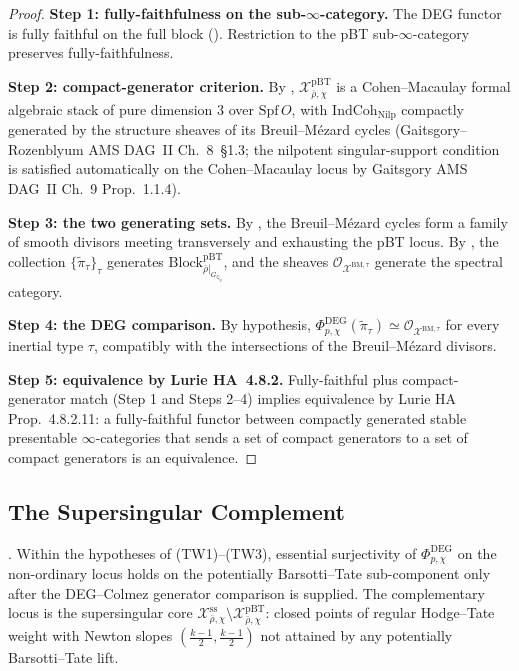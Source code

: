 \begin{proof}
\textbf{Step 1: fully-faithfulness on the sub-\(\infty\)-category.}
The DEG functor is fully faithful on the full block
(). Restriction to the pBT
sub-\(\infty\)-category preserves fully-faithfulness.

\textbf{Step 2: compact-generator criterion.} By
, \(\mathcal{X}^{\mathrm{pBT}}_{\bar\rho,\chi}\)
is a Cohen--Macaulay formal algebraic stack of pure dimension \(3\)
over \(\mathrm{Spf}\,O\), with \(\mathrm{IndCoh}_{\mathrm{Nilp}}\)
compactly generated by the structure sheaves of its Breuil--M{\'e}zard
cycles (Gaitsgory--Rozenblyum AMS DAG~II Ch.~8~\S 1.3; the nilpotent
singular-support condition is satisfied automatically on the
Cohen--Macaulay locus by Gaitsgory AMS DAG~II Ch.~9 Prop.~1.1.4).

\textbf{Step 3: the two generating sets.} By
, the Breuil--M{\'e}zard cycles
form a family of smooth divisors meeting transversely and
exhausting the pBT locus. By ,
the collection \(\{\widetilde{\pi}_{\tau}\}_{\tau}\) generates
\(\mathrm{Block}^{\mathrm{pBT}}_{\bar\rho|_{G_{\mathbb{Q}_{p}}}}\), and
the sheaves \(\mathcal{O}_{\mathcal{X}^{\mathrm{BM},\tau}}\) generate
the spectral category.

\textbf{Step 4: the DEG comparison.} By hypothesis,
\(\Phi^{\mathrm{DEG}}_{p,\chi}(\widetilde{\pi}_{\tau})\simeq
\mathcal{O}_{\mathcal{X}^{\mathrm{BM},\tau}}\) for every inertial type
\(\tau\), compatibly with the intersections of the
Breuil--M{\'e}zard divisors.

\textbf{Step 5: equivalence by Lurie HA~4.8.2.} Fully-faithful plus
compact-generator match (Step 1 and Steps 2--4) implies equivalence
by Lurie HA Prop.~4.8.2.11: a fully-faithful functor between
compactly generated stable presentable \(\infty\)-categories that sends
a set of compact generators to a set of compact generators is an
equivalence.
\end{proof}

\subsection{The Supersingular Complement}

\begin{corollary}
\label{v4-arith:w6-e:cor:f1a1-non-ord-pBT}
\ClaimStatusNeedsVerification. Within the hypotheses of
 (TW1)--(TW3), essential surjectivity of
\(\Phi^{\mathrm{DEG}}_{p,\chi}\) on the non-ordinary locus holds on
the potentially Barsotti--Tate sub-component only after the
DEG--Colmez generator comparison is supplied.
The complementary locus is the supersingular core
\(\mathcal{X}^{\mathrm{ss}}_{\bar\rho,\chi}\setminus
\mathcal{X}^{\mathrm{pBT}}_{\bar\rho,\chi}\): closed points of
regular Hodge--Tate weight with Newton slopes
\((\tfrac{k-1}{2},\tfrac{k-1}{2})\) not attained by any potentially
Barsotti--Tate lift.
\end{corollary}

